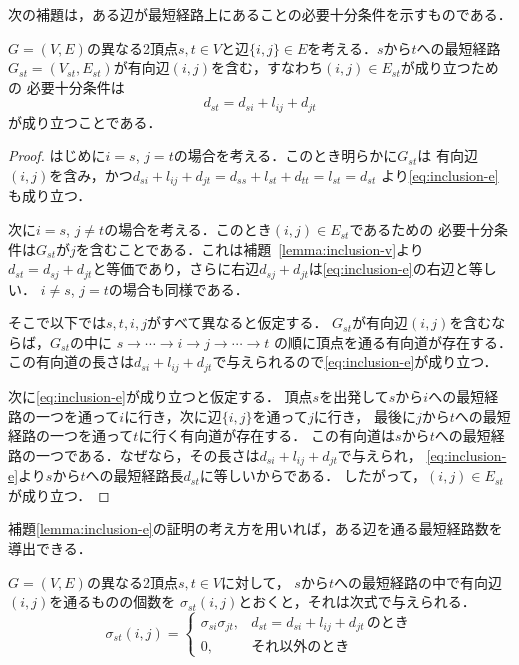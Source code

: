 次の補題は，ある辺が最短経路上にあることの必要十分条件を示すものである．

\begin{lemma}
  \label{lemma:inclusion-e}
  $G=(V,E)$の異なる2頂点$s,t\in V$と辺$\{i,j\} \in E$を考える．$s$から$t$への最短経路
  $G_{st}=(V_{st},E_{st})$が有向辺$(i,j)$を含む，すなわち$(i,j) \in E_{st}$が成り立つための
  必要十分条件は
  \begin{equation}
    d_{st}=d_{si}+l_{ij}+d_{jt}
    \label{eq:inclusion-e}
  \end{equation}
  が成り立つことである．
\end{lemma}
\begin{proof}
  はじめに$i=s$, $j=t$の場合を考える．このとき明らかに$G_{st}$は
  有向辺$(i,j)$を含み，かつ$d_{si}+l_{ij}+d_{jt}=d_{ss}+l_{st}+d_{tt}=l_{st}=d_{st}$
  より\eqref{eq:inclusion-e}も成り立つ．

  次に$i=s$, $j \neq t$の場合を考える．このとき$(i,j)\in E_{st}$であるための
  必要十分条件は$G_{st}$が$j$を含むことである．これは補題~\ref{lemma:inclusion-v}より
  $d_{st}=d_{sj}+d_{jt}$と等価であり，さらに右辺$d_{sj}+d_{jt}$は\eqref{eq:inclusion-e}の右辺と等しい．
  $i\neq s$, $j=t$の場合も同様である．

  そこで以下では$s,t,i,j$がすべて異なると仮定する．
  $G_{st}$が有向辺$(i,j)$を含むならば，$G_{st}$の中に
  $s \rightarrow \cdots \rightarrow i \rightarrow j \rightarrow \cdots \rightarrow t$
  の順に頂点を通る有向道が存在する．
  この有向道の長さは$d_{si}+l_{ij}+d_{jt}$で与えられるので\eqref{eq:inclusion-e}が成り立つ．

  次に\eqref{eq:inclusion-e}が成り立つと仮定する．
  頂点$s$を出発して$s$から$i$への最短経路の一つを通って$i$に行き，次に辺$\{i,j\}$を通って$j$に行き，
  最後に$j$から$t$への最短経路の一つを通って$t$に行く有向道が存在する．
  この有向道は$s$から$t$への最短経路の一つである．なぜなら，その長さは$d_{si}+l_{ij}+d_{jt}$で与えられ，
  \eqref{eq:inclusion-e}より$s$から$t$への最短経路長$d_{st}$に等しいからである．
  したがって，$(i,j) \in E_{st}$が成り立つ．
\end{proof}

補題\ref{lemma:inclusion-e}の証明の考え方を用いれば，ある辺を通る最短経路数を導出できる．

\begin{lemma-without-proof}
  $G=(V,E)$の異なる2頂点$s,t \in V$に対して，
  $s$から$t$への最短経路の中で有向辺$(i,j)$を通るものの個数を
  $\sigma_{st}(i,j)$とおくと，それは次式で与えられる．
  \begin{equation*}
    \sigma_{st}(i,j)=
    \begin{cases}
      \sigma_{si} \sigma_{jt}, & d_{st}=d_{si}+l_{ij}+d_{jt}\,\text{のとき} \\
      0, & \text{それ以外のとき}
    \end{cases}
  \end{equation*}
\end{lemma-without-proof}

